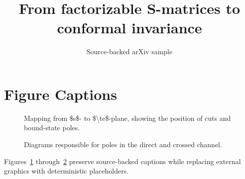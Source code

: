 \documentclass[11pt]{article}
\title{From factorizable S-matrices to conformal invariance}
\author{Source-backed arXiv sample}
\date{}
\begin{document}
\maketitle
\section{Figure Captions}

\begin{figure}[htbp]
\centering
\fbox{\rule{0pt}{1.15in}\rule{0.78\linewidth}{0pt}}
\caption{Mapping from \$s\$- to \$\textbackslash{}te\$-plane, showing the position of cuts and bound-state poles.}
\label{fig:source-1}
\end{figure}


\begin{figure}[htbp]
\centering
\fbox{\rule{0pt}{1.15in}\rule{0.78\linewidth}{0pt}}
\caption{Diagrams responsible for poles in the direct and crossed channel.}
\label{fig:source-2}
\end{figure}


Figures~\ref{fig:source-1} through~\ref{fig:source-2} preserve source-backed captions while replacing external graphics with deterministic placeholders.
\end{document}
